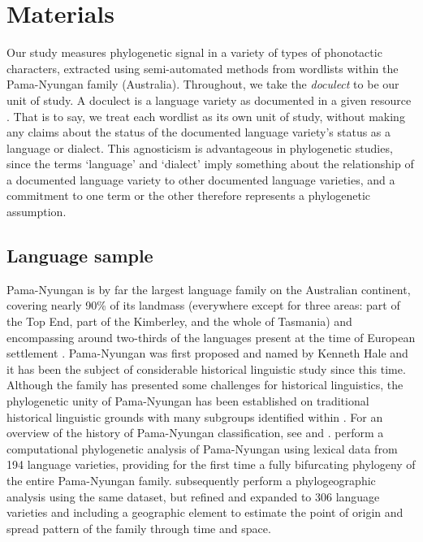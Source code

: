 \hypertarget{phylo-sig-materials}{%
\section{Materials}\label{phylo-sig-materials}}

Our study measures phylogenetic signal in a variety of types of phonotactic characters, extracted using semi-automated methods from wordlists within the Pama-Nyungan family (Australia). Throughout, we take the \emph{doculect} to be our unit of study. A doculect is a language variety as documented in a given resource \autocites{cysouw_towards_2007}{good_languoid_2013}. That is to say, we treat each wordlist as its own unit of study, without making any claims about the status of the documented language variety's status as a language or dialect. This agnosticism is advantageous in phylogenetic studies, since the terms `language' and `dialect' imply something about the relationship of a documented language variety to other documented language varieties, and a commitment to one term or the other therefore represents a phylogenetic assumption.

\hypertarget{phylo-sig-language-sample}{%
\subsection{Language sample}\label{phylo-sig-language-sample}}

Pama-Nyungan is by far the largest language family on the Australian continent, covering nearly 90\% of its landmass (everywhere except for three areas: part of the Top End, part of the Kimberley, and the whole of Tasmania) and encompassing around two-thirds of the languages present at the time of European settlement \autocite[p.~817]{bowern_computational_2012}. Pama-Nyungan was first proposed and named by Kenneth Hale \autocite[p.~136]{wurm_aboriginal_1963} and it has been the subject of considerable historical linguistic study since this time. Although the family has presented some challenges for historical linguistics, the phylogenetic unity of Pama-Nyungan has been established on traditional historical linguistic grounds \autocite{alpher_pama-nyungan:_2004} with many subgroups identified within \autocites[for example,][]{ogrady_languages_1966}{wurm_languages_1972}{austin_proto-kanyara_1981}. For an overview of the history of Pama-Nyungan classification, see \textcite[ch.~1--5]{bowern_australian_2004} and \textcite{koch_historical_2014}. \textcite{bowern_computational_2012} perform a computational phylogenetic analysis of Pama-Nyungan using lexical data from 194 language varieties, providing for the first time a fully bifurcating phylogeny of the entire Pama-Nyungan family. \textcite{bouckaert_origin_2018} subsequently perform a phylogeographic analysis using the same dataset, but refined and expanded to 306 language varieties and including a geographic element to estimate the point of origin and spread pattern of the family through time and space.

